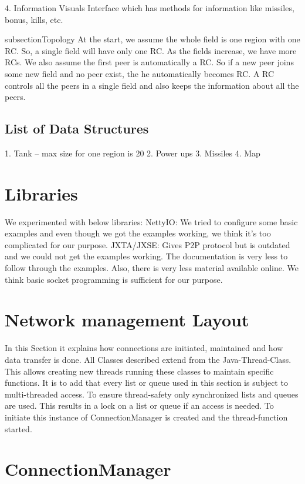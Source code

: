 \documentclass[paper=a4, fontsize=11pt]{scrartcl}
\numberwithin{equation}{section}
\numberwithin{figure}{section}
\numberwithin{table}{section}
\begin{document}
4. Information Visuals
Interface which has methods for information like missiles, bonus, kills, etc.

subsection{Topology}
At the start, we assume the whole field is one region with one RC. So, a single field will have only
one RC. As the fields increase, we have more RCs.
We also assume the first peer is automatically a RC. So if a new peer joins some new field and no
peer exist, the he automatically becomes RC.
A RC controls all the peers in a single field and also keeps the information about all the peers.

\subsection{List of Data Structures}

1. Tank – max size for one region is 20
2. Power ups
3. Missiles
4. Map

\section{Libraries}
We experimented with below libraries:
NettyIO: We tried to configure some basic examples and even though we got the examples working, we think it’s too complicated for our purpose.
JXTA/JXSE: Gives P2P protocol but is outdated and we could not get the examples working. The documentation is very less to follow through the examples. Also, there is very less material available online. We think basic socket programming is sufficient for our purpose.


\section{Network management Layout}
In this Section it explains how connections are initiated, maintained and how data transfer is done. All Classes described extend from the Java-Thread-Class. This allows creating new threads running these classes to maintain specific functions. It is to add that every list or queue used in this section is subject to multi-threaded access. To ensure thread-safety only synchronized lists and queues are used. This results in a lock on a list or queue if an access is needed.
To initiate this instance of ConnectionManager is created and the thread-function started.


\section{ConnectionManager}
\end{document}
